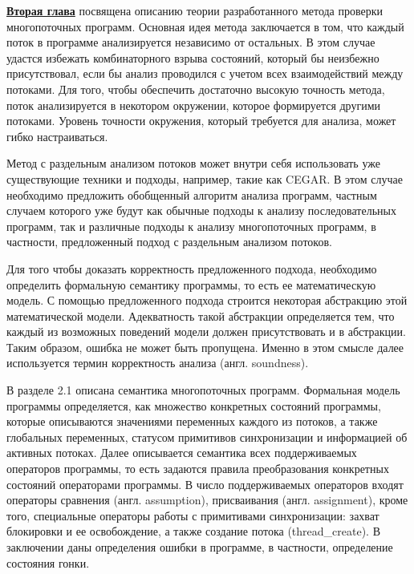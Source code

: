 \underline{\textbf{Вторая глава}} посвящена описанию теории разработанного метода проверки многопоточных программ.
Основная идея метода заключается в том, что каждый поток в программе анализируется независимо от остальных.
В этом случае удастся избежать комбинаторного взрыва состояний, который бы неизбежно присутствовал, если бы анализ проводился с учетом всех взаимодействий между потоками.
Для того, чтобы обеспечить достаточно высокую точность метода, поток анализируется в некотором окружении, которое формируется другими потоками. 
Уровень точности окружения, который требуется для анализа, может гибко настраиваться.

Метод с раздельным анализом потоков может внутри себя использовать уже существующие техники и подходы, например, такие как CEGAR.
В этом случае необходимо предложить обобщенный алгоритм анализа программ, частным случаем которого уже будут как обычные подходы к анализу последовательных программ, так и различные подходы к анализу многопоточных программ, в частности, предложенный подход с раздельным анализом потоков. 

Для того чтобы доказать корректность предложенного подхода, необходимо определить формальную семантику программы, то есть ее математическую модель.
С помощью предложенного подхода строится некоторая абстракцию этой математической модели. 
Адекватность такой абстракции определяется тем, что каждый из возможных поведений модели должен присутствовать и в абстракции.
Таким образом, ошибка не может быть пропущена.
Именно в этом смысле далее используется термин корректность анализа (англ. soundness).

В разделе 2.1 описана семантика многопоточных программ. 
Формальная модель программы определяется, как множество конкретных состояний программы, которые описываются значениями переменных каждого из потоков, а также глобальных переменных, статусом примитивов синхронизации и информацией об активных потоках.
Далее описывается семантика всех поддерживаемых операторов программы, то есть задаются правила преобразования конкретных состояний операторами программы.
В число поддерживаемых операторов входят операторы сравнения (англ. assumption), присваивания (англ. assignment),
кроме того, специальные операторы работы с примитивами синхронизации: захват блокировки и ее освобождение, а также создание потока (thread\_create).
В заключении даны определения ошибки в программе, в частности, определение состояния гонки.

